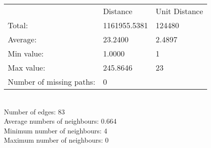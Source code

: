 \begin{tabular}{lll}
 & Distance & Unit Distance\\
Total: & 1161955.5381 & 124480\\
Average: & 23.2400 & 2.4897\\
Min value: & 1.0000 & 1\\
Max value: & 245.8646 & 23\\
\hline
Number of missing paths: & 0 &\\
\end{tabular}\\
Number of edges: 83\\
Average numbers of neighbours: 0.664\\
Minimum number of neighbours: 4\\
Maximum number of neighbours: 0\\

